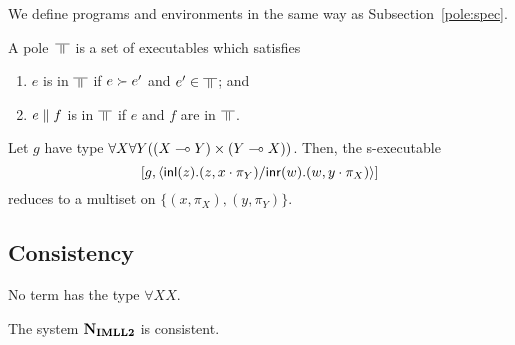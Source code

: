 We define programs and environments in the same way as
Subsection~\ref{pole:spec}.

\begin{definition}
 \label{def:pole}
A pole~$\bbot$ is a set of executables
which satisfies
\begin{enumerate}
 \item \label{red-closed} $e$ is in $\bbot$ if $e\succ e'$ and
       $e'\in\bbot$; and
 \item \label{conc-closed} $e\parallel f$ is in $\bbot$ if $e$ and $f$ are in $\bbot$.
\end{enumerate}
\end{definition}


 \begin{theorem}[Adequacy]
 \end{theorem}

  \begin{proposition}
   Let $g$ have type ${\forall X\forall
   Y((X\multimap Y)\times (Y\multimap X))}$.
   Then, the s-executable
   \[
   [g, \langle \mathsf{inl}({z}). ({z},{x\cdot\pi_Y})/ \mathsf{inr}({w}). ({w},{y\cdot\pi_X})\rangle]
   \]
   reduces to a multiset on
   $\{(x,\pi_X), (y,\pi_Y)\}$.
  \end{proposition}

\subsection{Consistency}

\begin{proposition}
  No term has the type $\forall X X$.
\end{proposition}
\begin{corollary}
 The system $\mathbf{N}_{\mathbf{IMLL2}}$ is consistent.
\end{corollary}

